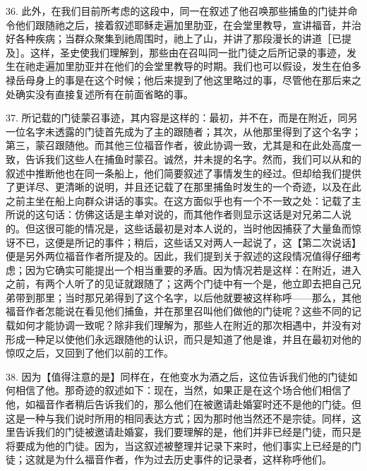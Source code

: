 36. 此外，在我们目前所考虑的这段中，同一在叙述了他召唤那些捕鱼的门徒并命令他们跟随祂之后，接着叙述耶稣走遍加里肋亚，在会堂里教导，宣讲福音，并治好各种疾病；当群众聚集到祂周围时，祂上了山，并讲了那段漫长的讲道［已提及］。这样，圣史使我们理解到，那些由在召叫同一批门徒之后所记录的事迹，发生在祂走遍加里肋亚并在他们的会堂里教导的时期。我们也可以假设，发生在伯多禄岳母身上的事是在这个时候；他后来提到了他这里略过的事，尽管他在那后来之处确实没有直接复述所有在前面省略的事。\par

37. 所记载的门徒蒙召事迹，其内容是这样的：最初，并不在，而是在附近，同另一位名字未透露的门徒首先成为了主的跟随者；其次，从他那里得到了这个名字；第三，蒙召跟随他。而其他三位福音作者，彼此协调一致，尤其是和在此处高度一致，告诉我们这些人在捕鱼时蒙召。诚然，并未提的名字。然而，我们可以从和的叙述中推断他也在同一条船上，他们简要叙述了事情发生的经过。但却给我们提供了更详尽、更清晰的说明，并且还记载了在那里捕鱼时发生的一个奇迹，以及在此之前主坐在船上向群众讲话的事实。在这方面似乎也有一个不一致之处：记载了主所说的这句话：仿佛这话是主单对说的，而其他作者则显示这话是对兄弟二人说的。但这很可能的情况是，这些话最初是对本人说的，当时他因捕获了大量鱼而惊讶不已，这便是所记的事件；稍后，这些话又对两人一起说了，这【第二次说话】便是另外两位福音作者所提及的。因此，我们提到关于叙述的这段情况值得仔细考虑；因为它确实可能提出一个相当重要的矛盾。因为情况若是这样：在附近，进入之前，有两个人听了的见证就跟随了；这两个门徒中有一个是，他立即去把自己兄弟带到那里；当时那兄弟得到了这个名字，以后他就要被这样称呼——那么，其他福音作者怎能说在看见他们捕鱼，并在那里召叫他们做他的门徒呢？这些不同的记载如何才能协调一致呢？除非我们理解为，那些人在附近的那次相遇中，并没有对形成一种足以使他们永远跟随他的认识，而只是知道了他是谁，并且在最初对他的惊叹之后，又回到了他们以前的工作。\par

38. 因为【值得注意的是】同样在，在他变水为酒之后，这位告诉我们他的门徒如何相信了他。那奇迹的叙述如下：现在，当然，如果正是在这个场合他们相信了他，如福音作者稍后告诉我们的，那么他们在被邀请赴婚宴时还不是他的门徒。但这是一种与我们说时所用的相同表达方式；因为那时他当然还不是宗徒。同样，这里告诉我们的门徒被邀请赴婚宴，我们要理解的是，他们并非已经是门徒，而只是将要成为他的门徒。因为，当这叙述被整理并记录下来时，他们事实上已经是的门徒；这就是为什么福音作者，作为过去历史事件的记录者，这样称呼他们。\par

